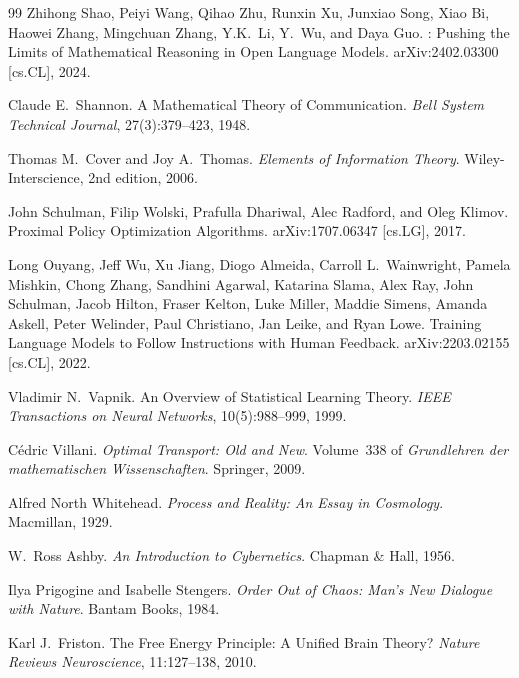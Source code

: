 \documentclass[11pt, a4paper, openany]{book}
\theoremstyle{plain}
\theoremstyle{definition}
\theoremstyle{remark}
\begin{document}
\begin{thebibliography}{99}
Zhihong Shao, Peiyi Wang, Qihao Zhu, Runxin Xu, Junxiao Song, Xiao Bi,
Haowei Zhang, Mingchuan Zhang, Y.K.\ Li, Y.\ Wu, and Daya Guo.
: Pushing the Limits of Mathematical Reasoning in
  Open Language Models.
\newblock arXiv:2402.03300 [cs.CL], 2024.

Claude E.\ Shannon.
\newblock A Mathematical Theory of Communication.
\newblock \textit{Bell System Technical Journal}, 27(3):379--423, 1948.

Thomas M.\ Cover and Joy A.\ Thomas.
\newblock \textit{Elements of Information Theory}.
\newblock Wiley-Interscience, 2nd edition, 2006.

John Schulman, Filip Wolski, Prafulla Dhariwal, Alec Radford, and Oleg Klimov.
\newblock Proximal Policy Optimization Algorithms.
\newblock arXiv:1707.06347 [cs.LG], 2017.

Long Ouyang, Jeff Wu, Xu Jiang, Diogo Almeida, Carroll L.\ Wainwright,
Pamela Mishkin, Chong Zhang, Sandhini Agarwal, Katarina Slama, Alex Ray,
John Schulman, Jacob Hilton, Fraser Kelton, Luke Miller, Maddie Simens,
Amanda Askell, Peter Welinder, Paul Christiano, Jan Leike, and Ryan Lowe.
\newblock Training Language Models to Follow Instructions with Human Feedback.
\newblock arXiv:2203.02155 [cs.CL], 2022.

Vladimir N.\ Vapnik.
\newblock An Overview of Statistical Learning Theory.
\newblock \textit{IEEE Transactions on Neural Networks}, 10(5):988--999, 1999.

C\'edric Villani.
\newblock \textit{Optimal Transport: Old and New}.
\newblock Volume~338 of \textit{Grundlehren der mathematischen Wissenschaften}.
  Springer, 2009.

Alfred North Whitehead.
\newblock \textit{Process and Reality: An Essay in Cosmology}.
\newblock Macmillan, 1929.

W.\ Ross Ashby.
\newblock \textit{An Introduction to Cybernetics}.
\newblock Chapman \& Hall, 1956.

Ilya Prigogine and Isabelle Stengers.
\newblock \textit{Order Out of Chaos: Man's New Dialogue with Nature}.
\newblock Bantam Books, 1984.

Karl J.\ Friston.
\newblock The Free Energy Principle: A Unified Brain Theory?
\newblock \textit{Nature Reviews Neuroscience}, 11:127--138, 2010.

\end{thebibliography}
\end{document}
